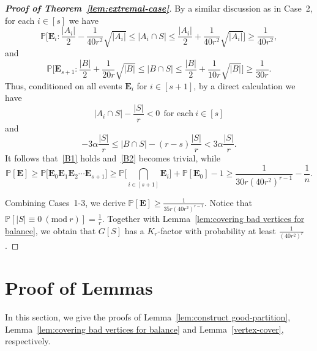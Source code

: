 \documentclass[11pt, a4paper]{article}
\theoremstyle{definition}
\newcommand{\eps}{\varepsilon}
\newcommand{\<}{\subseteq}
\newcommand{\de}{\delta}
\begin{document}
\begin{proof}[{\bf Proof of Theorem~\ref{lem:extremal-case}}]
By a similar discussion as in Case~2, for each $i\in [s]$ we have 
\[
\mathbb{P}\Big[\mathbf{E}_i:\frac{|A_i|}{2}-\frac{1}{40r^2}\sqrt{|A_i|}\leq |A_i\cap S|\leq \frac{|A_i|}{2}+\frac{1}{40r^2}\sqrt{|A_i|}\Big]\geq \frac{1}{40r^2},
\]
and
$$
\mathbb{P}\Big[\mathbf{E}_{s+1}:\frac{|B|}{2}+\frac{1}{20r}\sqrt{|B|}\leq |B\cap S|\leq \frac{|B|}{2}+\frac{1}{10r}\sqrt{|B|}\Big]\ge \frac{1}{30r}.
$$
Thus, conditioned on all events $\mathbf{E}_i$ for $i\in [s+1]$, by a direct calculation we have 
$$
|A_i\cap S|-\frac{|S|}{r}<0\ \ \text{for each}\ i\in [s]$$
and
$$-3\alpha \frac{|S|}{r}\leq |B\cap S|-{(r-s)\frac{|S|}{r}}<3\alpha \frac{|S|}{r}. 
$$
It follows that~\ref{B1} holds and~\ref{B2} becomes trivial, while 
$${\mathbb{P}[\mathbf{E}]\geq \mathbb{P}\big[\mathbf{E}_0\mathbf{E}_1\mathbf{E}_2\cdots\mathbf{E}_{s+1} \big]\geq \mathbb{P}\Big[{\bigcap_{i\in [s+1]}\mathbf{E}_i }\Big]+
\mathbb{P}[\mathbf{E}_0 ]-1\ge  \frac{1}{30r(40r^2)^{r-1}}-\frac{1}{n}.}$$


\medskip
Combining Cases~1-3, we derive $\mathbb{P}[\mathbf{E}]\geq \frac{1}{35r(40r^2)^{r-1}}$.  Notice that $\mathbb{P}[|S|\equiv0~(\text{mod}~r)]=\frac{1}{r}$. Together with Lemma~\ref{lem:covering bad vertices for balance}, we obtain that $G[S]$ has a $K_r$-factor with probability at least $\frac{1}{(40r^2)^r}$. 
\end{proof}


\section{Proof of Lemmas}\label{sec:lemma}
In this section, we give the proofs of Lemma~\ref{lem:construct good-partition}, Lemma~\ref{lem:covering bad vertices for balance} and Lemma~\ref{vertex-cover}, respectively. 
\end{document}
